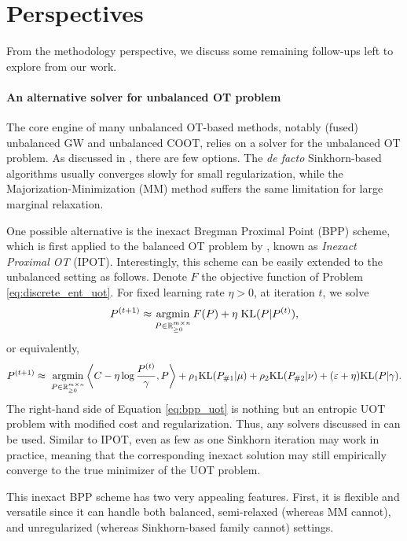 \section{Perspectives}

From the methodology perspective, we discuss some remaining follow-ups left to explore from our work.

\paragraph{An alternative solver for unbalanced OT problem}
The core engine of many unbalanced OT-based methods, notably (fused) unbalanced GW and unbalanced COOT,
relies on a solver for the unbalanced OT problem. As discussed in ,
there are few options. The \textit{de facto} Sinkhorn-based algorithms \citep{Sejourne19,Sejourne21}
usually converges slowly for small regularization, while the
Majorization-Minimization (MM) method \citep{Chapel21}
suffers the same limitation for large marginal relaxation.

One possible alternative is the inexact Bregman Proximal Point (BPP) scheme,
which is first applied to the balanced OT problem by \citet{Xie20},
known as \textit{Inexact Proximal OT} (IPOT). Interestingly,
this scheme can be easily extended to the unbalanced setting as follows.
Denote $F$ the objective function of Problem \eqref{eq:discrete_ent_uot}.
For fixed learning rate $\eta > 0$, at iteration $t$, we solve
\begin{align}
  \label{eq:bpp_eot}
  P^{(t+1)} \approx \operatorname*{argmin}_{P \in \mathbb R^{m \times n}_{\geq 0}} F(P) + \eta \; \text{KL}(P | P^{(t)}),
\end{align}
or equivalently,
\begin{align}
\label{eq:bpp_uot}
  P^{(t+1)} \approx \; \operatorname*{argmin}_{P \in \mathbb R^{m \times n}_{\geq 0}}
  \left \langle C - \eta \log \frac{P^{(t)}}{\gamma}, P \right \rangle
  + \rho_1 \text{KL}(P_{\# 1} | \mu) + \rho_2 \text{KL}(P_{\# 2} | \nu) + (\varepsilon + \eta) \text{KL}(P | \gamma).
\end{align}
The right-hand side of Equation \eqref{eq:bpp_uot} is nothing but an entropic UOT problem
with modified cost and regularization. Thus, any solvers discussed in 
can be used. Similar to IPOT, even as few as one Sinkhorn iteration may work in practice,
meaning that the corresponding inexact solution may still empirically converge to the true minimizer
of the UOT problem.

This inexact BPP scheme has two very appealing features. First, it is flexible and versatile since
it can handle both balanced, semi-relaxed (whereas MM cannot), and unregularized
(whereas Sinkhorn-based family cannot) settings.

